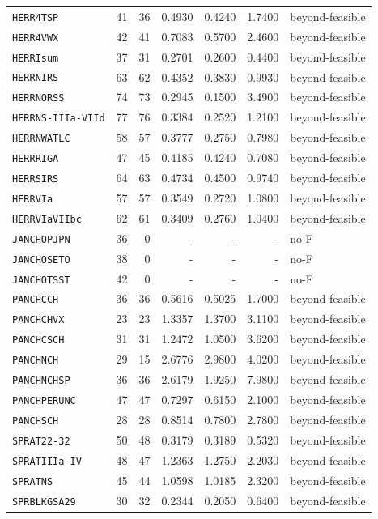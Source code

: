 \begin{landscape}
\begin{longtable}{@{}p{3.2cm}r r r r r l@{}}
\texttt{HERR4TSP} & 41 & 36 & 0.4930 & 0.4240 & 1.7400 & beyond-feasible \\
\texttt{HERR4VWX} & 42 & 41 & 0.7083 & 0.5700 & 2.4600 & beyond-feasible \\
\texttt{HERRIsum} & 37 & 31 & 0.2701 & 0.2600 & 0.4400 & beyond-feasible \\
\texttt{HERRNIRS} & 63 & 62 & 0.4352 & 0.3830 & 0.9930 & beyond-feasible \\
\texttt{HERRNORSS} & 74 & 73 & 0.2945 & 0.1500 & 3.4900 & beyond-feasible \\
\texttt{HERRNS-IIIa-VIId} & 77 & 76 & 0.3384 & 0.2520 & 1.2100 & beyond-feasible \\
\texttt{HERRNWATLC} & 58 & 57 & 0.3777 & 0.2750 & 0.7980 & beyond-feasible \\
\texttt{HERRRIGA} & 47 & 45 & 0.4185 & 0.4240 & 0.7080 & beyond-feasible \\
\texttt{HERRSIRS} & 64 & 63 & 0.4734 & 0.4500 & 0.9740 & beyond-feasible \\
\texttt{HERRVIa} & 57 & 57 & 0.3549 & 0.2720 & 1.0800 & beyond-feasible \\
\texttt{HERRVIaVIIbc} & 62 & 61 & 0.3409 & 0.2760 & 1.0400 & beyond-feasible \\
\texttt{JANCHOPJPN} & 36 & 0 & - & - & - & no-F \\
\texttt{JANCHOSETO} & 38 & 0 & - & - & - & no-F \\
\texttt{JANCHOTSST} & 42 & 0 & - & - & - & no-F \\
\texttt{PANCHCCH} & 36 & 36 & 0.5616 & 0.5025 & 1.7000 & beyond-feasible \\
\texttt{PANCHCHVX} & 23 & 23 & 1.3357 & 1.3700 & 3.1100 & beyond-feasible \\
\texttt{PANCHCSCH} & 31 & 31 & 1.2472 & 1.0500 & 3.6200 & beyond-feasible \\
\texttt{PANCHNCH} & 29 & 15 & 2.6776 & 2.9800 & 4.0200 & beyond-feasible \\
\texttt{PANCHNCHSP} & 36 & 36 & 2.6179 & 1.9250 & 7.9800 & beyond-feasible \\
\texttt{PANCHPERUNC} & 47 & 47 & 0.7297 & 0.6150 & 2.1000 & beyond-feasible \\
\texttt{PANCHSCH} & 28 & 28 & 0.8514 & 0.7800 & 2.7800 & beyond-feasible \\
\texttt{SPRAT22-32} & 50 & 48 & 0.3179 & 0.3189 & 0.5320 & beyond-feasible \\
\texttt{SPRATIIIa-IV} & 48 & 47 & 1.2363 & 1.2750 & 2.2030 & beyond-feasible \\
\texttt{SPRATNS} & 45 & 44 & 1.0598 & 1.0185 & 2.3200 & beyond-feasible \\
\texttt{SPRBLKGSA29} & 30 & 32 & 0.2344 & 0.2050 & 0.6400 & beyond-feasible \\
\end{longtable}
\end{landscape}
